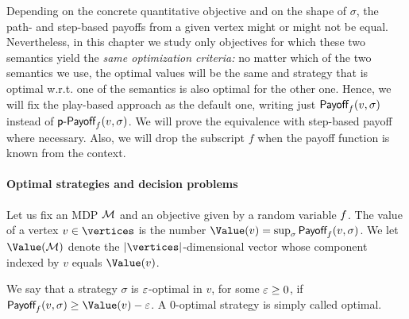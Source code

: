 
Depending on the concrete quantitative objective and on the shape of $\sigma$, the path- and step-based payoffs from a given vertex might or might not be equal. Nevertheless, in this chapter we study only objectives for which these two semantics yield the \emph{same optimization criteria:} no matter which of the two semantics we use, the optimal values will be the same and strategy that is optimal w.r.t. one of the semantics is also optimal for the other one. Hence, we will fix the play-based approach as the default one, writing just $ \textsf{Payoff}_f(v,\sigma)$ instead of $ \textsf{p-Payoff}_f(v,\sigma) $. We will prove the equivalence with step-based payoff where necessary. Also, we will drop the subscript $ f $ when the payoff function is known from the context.



\paragraph{Optimal strategies and decision problems}

Let us fix an MDP $\mathcal{M}$ and an objective given by a random variable 
$f$. The value of a vertex $v\in\vertices$ is the number 
$\Value(v)=\sup_{\sigma} \Pay_f(v,\sigma)$. We let $\Value(\mdp)$ denote the $|\vertices|$-dimensional vector whose component 
indexed by $v$ equals $\Value(v)$.

We say that a strategy $\sigma$ is $\varepsilon$-optimal in $v$, for some $\varepsilon\geq 0$, if $\Pay_f(v,\sigma) \geq \Value(v) - \eps$. A $0$-optimal strategy is simply called optimal. 

